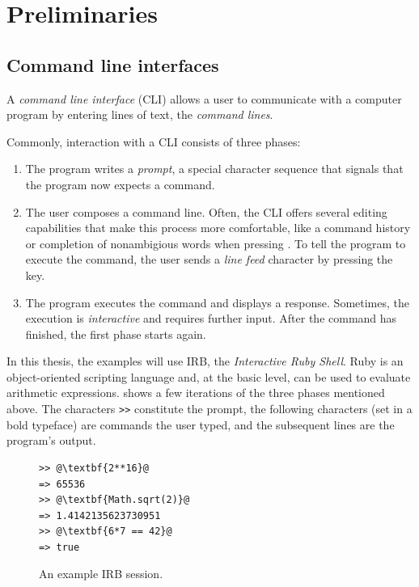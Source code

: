 \documentclass[paper=a4,twoside,abstract=on,cleardoublepage=empty,numbers=noenddot,toc=bib,12pt,appendixprefix=true]{scrreprt}
\begin{document}
\chapter{Preliminaries}
\label{sec:preliminaries}

\section{Command line interfaces}
\label{sec:cli}

A \emph{command line interface} (\textsc{CLI}) allows a user to communicate with a computer program by entering lines of text, the \emph{command lines}.

Commonly, interaction with a \textsc{CLI} consists of three phases:

\begin{enumerate}
    \item The program writes a \emph{prompt}, a special character sequence that signals that the program now expects a command.
    \item The user composes a command line. Often, the CLI offers several editing capabilities that make this process more comfortable, like a command history or completion of nonambigious words when pressing . To tell the program to execute the command, the user sends a \emph{line feed} character by pressing the  key.
    \item The program executes the command and displays a response. Sometimes, the execution is \emph{interactive} and requires further input. After the command has finished, the first phase starts again.
\end{enumerate}

In this thesis, the examples will use IRB, the \emph{Interactive Ruby Shell}. Ruby is an object-oriented scripting language and, at the basic level, can be used to evaluate arithmetic expressions.  shows a few iterations of the three phases mentioned above. The characters \texttt{>\->} constitute the prompt, the following characters (set in a bold typeface) are commands the user typed, and the subsequent lines are the program's output.

\begin{figure}[tb]
    \begin{lstlisting}[escapechar=@,frame=shadowbox]
>> @\textbf{2**16}@
=> 65536
>> @\textbf{Math.sqrt(2)}@
=> 1.4142135623730951
>> @\textbf{6*7 == 42}@
=> true
    \end{lstlisting}
    \centering
    \caption{An example IRB session.}
    \label{fig:irb}
\end{figure}
\end{document}
